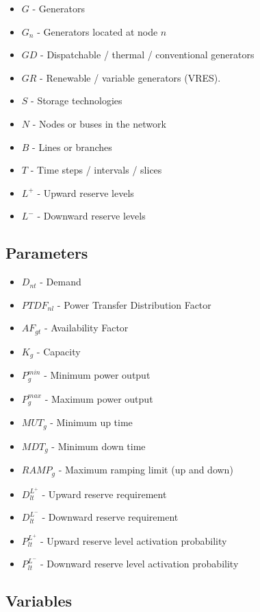 \documentclass[number,times]{elsarticle}
\begin{document}
\begin{itemize}
    \item $G$ - Generators
    \item $G_n$ - Generators located at node $n$
    \item $GD$ - Dispatchable / thermal / conventional generators
    \item $GR$ - Renewable / variable generators (\ac{VRES}).
    \item $S$ - Storage technologies
    \item $N$ - Nodes or buses in the network
    \item $B$ - Lines or branches
    \item $T$ - Time steps / intervals / slices
    \item $L^+$ - Upward reserve levels
    \item $L^-$ - Downward reserve levels
\end{itemize}

\subsection{Parameters}

\begin{itemize}
    \item $D_{nt}$ - Demand
    \item $PTDF_{nl}$ - Power Transfer Distribution Factor
    \item $AF_{gt}$ - Availability Factor
    \item $K_g$ - Capacity
    \item $P^{min}_g$ - Minimum power output
    \item $P^{max}_g$ - Maximum power output
    \item $MUT_g$ - Minimum up time
    \item $MDT_g$ - Minimum down time
    \item $RAMP_g$ - Maximum ramping limit (up and down)
    \item $D^{L^+}_{lt}$ - Upward reserve requirement
    \item $D^{L^-}_{lt}$ - Downward reserve requirement
    \item $P^{L^+}_{lt}$ - Upward reserve level activation probability
    \item $P^{L^-}_{lt}$ - Downward reserve level activation probability
\end{itemize}

\subsection{Variables}
\end{document}
